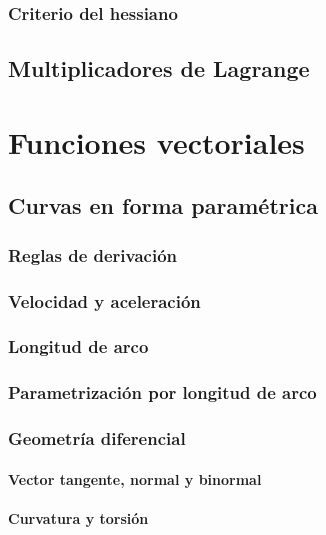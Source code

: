 \documentclass[12pt, fleqn]{report}                             %
\theoremstyle{break}                                            %
\begin{document}
            \subsection{Criterio del hessiano}
            
        \section{Multiplicadores de Lagrange}


    \chapter{Funciones vectoriales}
    
        \section{Curvas en forma paramétrica}
        
            \subsection{Reglas de derivación}
            
            \subsection{Velocidad y aceleración}
        
            \subsection{Longitud de arco}
            
            \subsection{Parametrización por longitud de arco}
            
            \subsection{Geometría diferencial}
                
                \subsubsection{Vector tangente, normal y binormal}
                
                \subsubsection{Curvatura y torsión}
                
\end{document}
